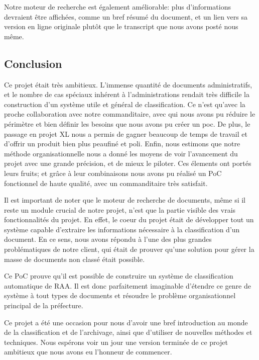 Notre moteur de recherche est également améliorable: plus d'informations devraient être affichées, comme un bref résumé du document, et un lien vers sa version en ligne originale plutôt que le transcript que nous avons posté nous même.

\subsection {Conclusion}
Ce projet était très ambitieux. L'immense quantité de documents administratifs, et le nombre de cas spéciaux inhérent à l'administrations rendait très difficile la construction d'un système utile et général de classification. Ce n'est qu'avec la proche collaboration avec notre commanditaire, avec qui nous avons pu réduire le périmètre et bien définir les besoins que nous avons pu créer un \gls{poc}. De plus, le passage en projet XL nous a permis de gagner beaucoup de temps de travail et d'offrir un produit bien plus peaufiné et poli. Enfin, nous estimons que notre méthode organisationnelle nous a donné les moyens de voir l'avancement du projet avec une grande précision, et de mieux le piloter. Ces élements ont portés leurs fruits; et grâce à leur combinaisons nous avons pu réalisé un PoC fonctionnel de haute qualité, avec un commanditaire très satisfait.

Il est important de noter que le moteur de recherche de documents, même si il reste un module crucial de notre projet, n'est que la partie visible des vrais fonctionnalités du projet.
En effet, le coeur du projet était de développer tout un système capable d'extraire les informations nécessaire à la classification d'un document.
En ce sens, nous avons répondu à l'une des plus grandes problématiques de notre client, qui était de prouver qu'une solution pour gérer la masse de documents non classé était possible.

Ce PoC prouve qu'il est possible de construire un système de classification automatique de RAA.
Il est donc parfaitement imaginable d'étendre ce genre de système à tout types de documents et résoudre le problème organisationnel principal de la préfecture.

Ce projet a été une occasion pour nous d'avoir une bref introduction au monde de la classification et de l'archivage, ainsi que d'utiliser de nouvelles méthodes et techniques.
Nous espérons voir un jour une version terminée de ce projet ambitieux que nous avons eu l'honneur de commencer.

